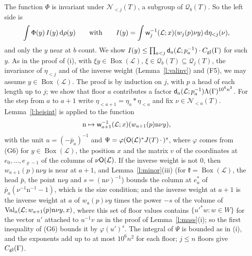 \documentclass[11pt,a4paper]{article}
\makeatletter
\theoremstyle{plainx}
\theoremstyle{uprightx}
\renewenvironment{proof}[1][Proof]{\par\pushQED{\qed}\normalfont\topsep0pt\partopsep0pt
  \trivlist\item[\hskip\labelsep\itshape #1.]\ignorespaces}{\popQED\endtrivlist\@endpefalse}
\newcommand{\cL}{\mathcal{L}}
\newcommand{\dd}{\mathrm{d}}
\newcommand{\JT}[1]{J(#1)}
\newcommand{\Ql}[2]{\mathcal{Q}_{#1}(#2)}
\newcommand{\Nb}[2]{\mathcal{N}_{<#1}(#2)}
\newcommand{\wl}[2]{w_{#1}(#2)}
\newcommand{\BoxL}[1]{\operatorname{Box}(#1)}
\newcommand{\etab}[1]{\eta_{<#1}}
\makeatother
\begin{document}
\begin{proof}[Proof of Theorem B\textup{(ii)}]
The function $\Phi$ is invariant under $\Nb{j}{T}$, a subgroup of $\Ql{b}{T}$. So the left side is
\[\int\Phi(y)\,I(y)\,\dd\rho(y)\qquad\text{with}\qquad I(y)=\int\invWeight{\cL}{j}{x}(\wl{j}{p}\nu y)\,\dd\etab{j}(\nu),\]
and only the $y$ near at $b$ count. We show $I(y)\le\prod_{a<j}\floorModulus{\cL}{a}{p_a^{-1}}\cdot\globalConst{\Gamma}$ for
such $y$. As in the proof of (i), with $\xi y\in\BoxL{\cL}$, $\xi\in\Ql{b}{T}\subseteq\Ql{j}{T}$, the invariance of
$\etab{j}$ and of the inverse weight (Lemma~\ref{l:valinv}) and (F5), we may assume $y\in\BoxL{\cL}$. The proof is
by induction on $j$, with $p$ a head of each length up to $j$; we show that floor $a$ contributes a factor
$\floorModulus{\cL}{a}{p_a^{-1}}\Lambda(\Gamma)^{10^6n^2}$. For the step from $a$ to $a+1$ write
$\etab{a+1}=\eta_a*\etab{a}$ and fix $\nu\in\Nb{a}{T}$. Lemma~\ref{l:heisint} is applied to the function
\[\mathrm{n}\mapsto\invWeight{\cL}{a+1}{x}(\wl{a+1}{p}\mathrm{n}\nu y),\]
with the unit $u=(-\bar p_a)^{-1}$ and $\Psi=\varphi(\orthonormalPart{\cL}^{*}\JT{T}\,\cdot\,)^{s}$, where $\varphi$ comes from (G6) for $y\in\BoxL{\cL}$,
the position $x$ and the matrix $v$ of the coordinates at $e_0,\dots,e_{\varrho-1}$ of the columns of
$\nu\orthonormalPart{\cL}$. If the inverse weight is not $0$, then $\wl{a+1}{p}\mathrm{n}\nu y$ is near at $a+1$,
and Lemma~\ref{l:minor}(iii) (for $\mathfrak{k}=\BoxL{\cL}$, the head $\bar p$, the point $\mathrm{n}\nu y$ and
$s=(\mathrm{n}\nu)^{-1}$) bounds the column at $e^*_a$ of $\bar p_a(\nu^{-1}\mathrm{n}^{-1}-1)$, which is the size
condition; and the inverse weight at $a+1$ is the inverse weight at $a$ of $\wl{a}{p}\nu y$ times the power $-s$ of the
volume of $\floorValues{\cL}{a}{\wl{a+1}{p}\mathrm{n}\nu y}{x}$, where this set of floor values contains
$\{u'^{*}w:w\in W\}$ for the vector $u'$ attached to $u^{-1}v$ as in the proof of Lemma~\ref{l:mass}(i); so the
first inequality of (G6) bounds it by $\varphi(u')^{s}$. The integral of $\Psi$ is bounded as in (i), and the
exponents add up to at most $10^6n^2$ for each floor; $j\le n$ floors give $C_{\mathrm{gl}}(\Gamma)$.
\end{proof}
\end{document}
